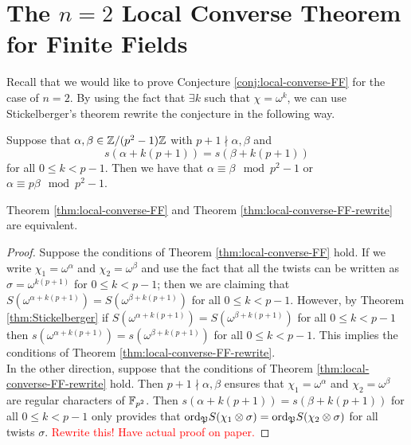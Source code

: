 \section{The $n=2$ Local Converse Theorem for Finite Fields}
\label{sec:n=2-LCT-FF}

Recall that we would like to prove Conjecture \ref{conj:local-converse-FF} for the case of $n=2$.
By using the fact that $\exists k$ such that $\chi = \omega^k$, we can use Stickelberger's theorem rewrite the conjecture in the following way.

\begin{theorem}\label{thm:local-converse-FF-rewrite}
Suppose that $\alpha, \beta \in \mathbb{Z}/(p^2 -1)\mathbb{Z}$ with $p+1 \nmid \alpha, \beta$ and \[s(\alpha + k(p+1)) = s(\beta + k(p+1))\] for all $0 \leq k < p-1$. Then we have that $\alpha \equiv \beta \mod p^2 - 1$ or $\alpha \equiv p \beta \mod p^2 -1$.
\end{theorem}

\begin{prop}
Theorem \ref{thm:local-converse-FF} and Theorem \ref{thm:local-converse-FF-rewrite} are equivalent.
\end{prop}

\begin{proof}
Suppose the conditions of Theorem \ref{thm:local-converse-FF} hold. 
If we write $\chi_1 = \omega^\alpha$ and $\chi_2 = \omega^\beta$ and use the fact that all the twists can be written as $\sigma = \omega^{k (p+1)}$ for $0 \leq k < p-1$; then we are claiming that $S(\omega^{\alpha + k(p+1)}) = S(\omega^{\beta+k(p+1)})$ for all $0 \leq k < p-1$. 
However, by Theorem \ref{thm:Stickelberger} if $S(\omega^{\alpha + k(p+1)}) = S(\omega^{\beta+k(p+1)})$ for all $0 \leq k < p-1$ then $s(\omega^{\alpha + k(p+1)}) = s(\omega^{\beta+k(p+1)})$ for all $0 \leq k < p-1$. 
This implies the conditions of Theorem \ref{thm:local-converse-FF-rewrite}.
\\

In the other direction, suppose that the conditions of Theorem \ref{thm:local-converse-FF-rewrite} hold. 
Then $p+1 \nmid \alpha, \beta$ ensures that $\chi_1 = \omega^\alpha$ and $\chi_2 = \omega^\beta$ are regular characters of $\mathbb{F}_{p^2}$. Then $s(\alpha + k(p+1)) = s(\beta + k(p+1))$ for all $0 \leq k < p-1$ only provides that $\textrm{ord}_{\mathfrak{P}} S(\chi_1 \otimes \sigma) = \textrm{ord}_{\mathfrak{P}} S(\chi_2 \otimes \sigma)$ for all twists $\sigma$. \textcolor{red}{Rewrite this! Have actual proof on paper.}

\end{proof}

